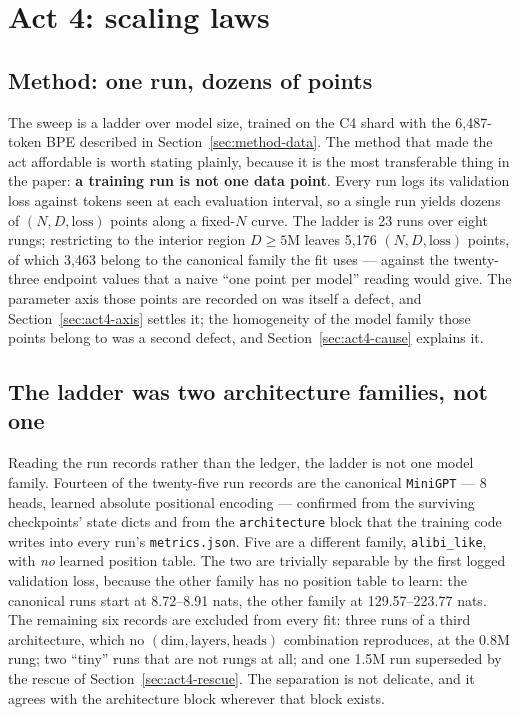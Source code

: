\documentclass[11pt,a4paper]{article}
\begin{document}
\section{Act 4: scaling laws}
\label{sec:act4}

\subsection{Method: one run, dozens of points}
\label{sec:act4-method}

The sweep is a ladder over model size, trained on the C4 shard with the
6,487-token BPE described in Section~\ref{sec:method-data}. The method
that made the act affordable is worth stating plainly, because it is the most
transferable thing in the paper: \textbf{a training run is not one data point}.
Every run logs its validation loss against tokens seen at each evaluation
interval, so a single run yields dozens of $(N, D, \mathrm{loss})$ points along
a fixed-$N$ curve. The ladder is 23 runs over eight rungs; restricting to the
interior region $D \geq 5$M leaves 5,176 $(N, D, \mathrm{loss})$ points, of
which 3,463 belong to the canonical family the fit uses --- against the
twenty-three endpoint values that a naive ``one point per model'' reading
would give. The parameter axis those points are recorded on
was itself a defect, and Section~\ref{sec:act4-axis} settles it; the
homogeneity of the model family those points belong to was a second defect,
and Section~\ref{sec:act4-cause} explains it.

\subsection{The ladder was two architecture families, not one}
\label{sec:act4-provenance}

Reading the run records rather than the ledger, the ladder is not one model
family. Fourteen of the twenty-five run records are the canonical
\texttt{MiniGPT} --- 8 heads, learned absolute positional encoding ---
confirmed from the surviving checkpoints' state dicts and from the
\texttt{architecture} block that the training code writes into every run's
\texttt{metrics.json}. Five are a different family, \texttt{alibi\_like}, with
\emph{no} learned position table. The two are trivially separable by the first
logged validation loss, because the other family has no position table to
learn: the canonical runs start at 8.72--8.91 nats, the other family at
129.57--223.77 nats. The remaining six records are excluded from every fit:
three runs of a third architecture, which no
$(\text{dim}, \text{layers}, \text{heads})$ combination reproduces, at the
0.8M rung; two ``tiny'' runs that are not rungs at all; and one 1.5M run
superseded by the rescue of Section~\ref{sec:act4-rescue}. The
separation is not delicate, and it agrees with the architecture block wherever
that block exists.
\end{document}
